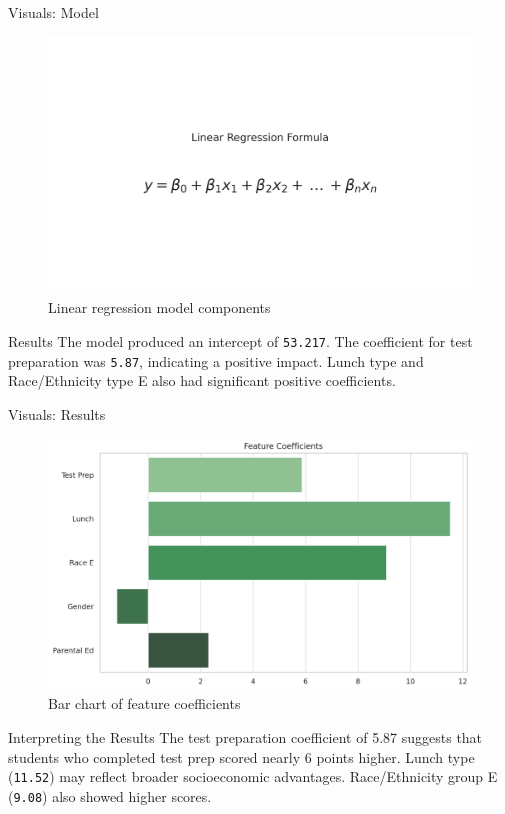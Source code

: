 \documentclass{beamer}
\begin{document}
\begin{frame}{Visuals: Model}
  \begin{figure}
    \includegraphics[width=0.9\linewidth]{model_formula_explained.png}
    \caption{Linear regression model components}
  \end{figure}
\end{frame}

\begin{frame}{Results}
  The model produced an intercept of \texttt{53.217}. The coefficient for test preparation was \texttt{5.87}, indicating a positive impact. Lunch type and Race/Ethnicity type E also had significant positive coefficients.
\end{frame}

\begin{frame}{Visuals: Results}
  \begin{figure}
    \includegraphics[width=0.9\linewidth]{feature_coefficients.png}
    \caption{Bar chart of feature coefficients}
  \end{figure}
\end{frame}

\begin{frame}{Interpreting the Results}
  The test preparation coefficient of 5.87 suggests that students who completed test prep scored nearly 6 points higher. Lunch type (\texttt{11.52}) may reflect broader socioeconomic advantages. Race/Ethnicity group E (\texttt{9.08}) also showed higher scores.
\end{frame}
\end{document}
